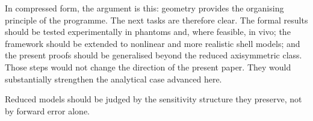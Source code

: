 In compressed form, the argument is this: geometry provides the organising
principle of the programme.  The next tasks are therefore clear.  The formal
results should be tested experimentally in phantoms and, where feasible, in
vivo; the framework should be extended to nonlinear and more realistic shell
models; and the present proofs should be generalised beyond the reduced
axisymmetric class.  Those steps would not change the direction of the present
paper.  They would substantially strengthen the analytical case advanced here.

Reduced models should be judged by the sensitivity structure they preserve,
not by forward error alone.
